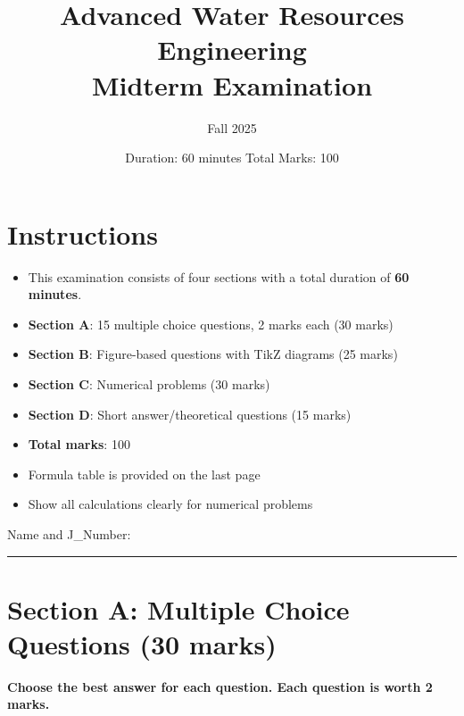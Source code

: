 \documentclass[11pt,a4paper]{article}
\title{\textbf{Advanced Water Resources Engineering\\
Midterm Examination}}
\author{Fall 2025}
\date{Duration: 60 minutes \quad Total Marks: 100}
\begin{document}
\maketitle

\vspace{-0.5cm}

\section*{Instructions}
\begin{itemize}[nosep]
    \item This examination consists of four sections with a total duration of \textbf{60 minutes}.
    \item \textbf{Section A}: 15 multiple choice questions, 2 marks each (30 marks)
    \item \textbf{Section B}: Figure-based questions with TikZ diagrams (25 marks)
    \item \textbf{Section C}: Numerical problems (30 marks)
    \item \textbf{Section D}: Short answer/theoretical questions (15 marks)
    \item \textbf{Total marks}: 100
    \item Formula table is provided on the last page
    \item Show all calculations clearly for numerical problems
\end{itemize}
\vspace{0.5cm}

Name and J\_Number: \underline{\hspace{10cm}}
\vspace{0.3cm}

\hrule
\vspace{0.3cm}

\section*{Section A: Multiple Choice Questions (30 marks)}
\textbf{Choose the best answer for each question. Each question is worth 2 marks.}
\end{document}
